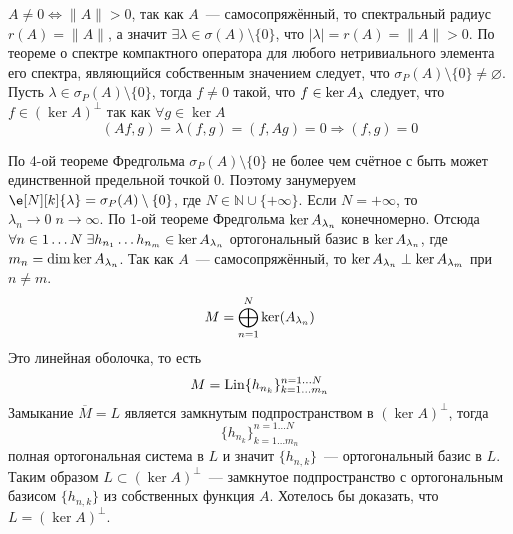 \documentclass[14pt]{extarticle}
\begin{document}
\begin{Proof}
    $A \ne 0 \Leftrightarrow \|A\| > 0$, так как $A$~--- самосопряжённый, то 
    спектральный радиус $r(A) = \|A\|$, а значит $\exists \lambda \in \sigma(A)
    \setminus\{0\}$, что $|\lambda| = r(A) = \|A\| > 0$.
    По теореме о спектре компактного оператора для любого нетривиального
    элемента его спектра, являющийся собственным значением следует, что
    $\sigma_P(A) \setminus\{0\} \ne \varnothing$. Пусть $\lambda \in \sigma_P(A)
    \setminus\{0\}$, тогда $f \ne 0$ такой, что $f \in \ker \Al$ следует, что
    $f \in (\ker A)^\perp$ так как $\forall g \in \ker A$
    $$
    (Af, g) = \lambda(f, g) = (f, Ag) = 0 \Rightarrow (f, g) = 0
    $$
    
    По 4-ой теореме Фредгольма $\sigma_P(A)\setminus\{0\}$ не более чем 
    счётное с быть может единственной предельной точкой 0. Поэтому 
    занумеруем $\e[N][k]{\lambda} = \sigma_P(A) \setminus\{0\}$, где $N 
    \in \mathbb N \cup \{+\infty\}$. Если $N = +\infty$, то $\lambda_n \to 0\;n \to
    \infty$.
    По 1-ой теореме Фредгольма $\ker \Al[n]$ конечномерно.
    Отсюда $\forall n \in 1 \dots N\; \exists h_{n_1}\dots h_{n_m} \in \ker \Al[n]$
    ортогональный базис в $\ker \Al[n]$, где $m_n = \dim \ker \Al[n]$.
    Так как $A$~--- самосопряжённый, то $\ker \Al[n] \perp \ker \Al[m]$ при $n \ne 
    m$.
    $$
    M = \bigoplus\limits_{n = 1}^N \ker(\Al[n])
    $$
    Это линейная оболочка, то есть
    $$
    M = \operatorname{Lin}\{h_{n_k}\}_{k = 1\dots m_n}^{n = 1 \dots N}
    $$
    Замыкание $\overline{M} = L$ является замкнутым подпространством в
    $(\ker A)^\perp$, тогда 
    $$
    \{h_{n_k}\}_{k = 1\dots m_n}^{n = 1 \dots N}
    $$
    полная ортогональная система в $L$ и значит $\{h_{n, k}\}$~--- 
    ортогональный базис в $L$.
    Таким образом $L \subset (\ker A)^\perp$~--- замкнутое подпространство с
    ортогональным базисом $\{h_{n,k}\}$ из собственных функция $A$.
    Хотелось бы доказать, что $L = (\ker A)^\perp$.
    

\end{Proof}
\end{document}
